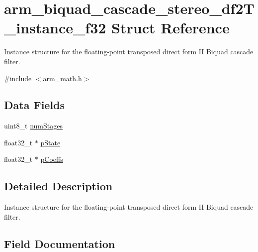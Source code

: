 \hypertarget{structarm__biquad__cascade__stereo__df2_t__instance__f32}{}\section{arm\+\_\+biquad\+\_\+cascade\+\_\+stereo\+\_\+df2\+T\+\_\+instance\+\_\+f32 Struct Reference}
\label{structarm__biquad__cascade__stereo__df2_t__instance__f32}


Instance structure for the floating-\/point transposed direct form II Biquad cascade filter.  




{\ttfamily \#include $<$arm\+\_\+math.\+h$>$}

\subsection*{Data Fields}
\begin{DoxyCompactItemize}
\item 
uint8\+\_\+t \mbox{\hyperlink{structarm__biquad__cascade__stereo__df2_t__instance__f32_a3615af038f56917909e0370c11bc2ec7}{num\+Stages}}
\item 
float32\+\_\+t $\ast$ \mbox{\hyperlink{structarm__biquad__cascade__stereo__df2_t__instance__f32_a335c87e6fdc4b96601d95a5de8b9c463}{p\+State}}
\item 
float32\+\_\+t $\ast$ \mbox{\hyperlink{structarm__biquad__cascade__stereo__df2_t__instance__f32_aacbb8dd8eeba4b21fc2bb40076405ee3}{p\+Coeffs}}
\end{DoxyCompactItemize}


\subsection{Detailed Description}
Instance structure for the floating-\/point transposed direct form II Biquad cascade filter. 

\subsection{Field Documentation}
\mbox{\label{structarm__biquad__cascade__stereo__df2_t__instance__f32_a3615af038f56917909e0370c11bc2ec7}} 
